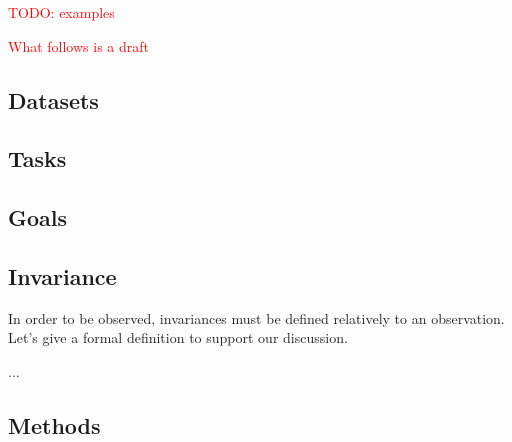 \textcolor{red}{TODO: examples}


%
%
\textcolor{red}{What follows is a draft}




\subsection{Datasets}

\subsection{Tasks} %
\label{tasks}



\subsection{Goals}

\subsection{Invariance}

In order to be observed, invariances must be defined relatively to an observation. Let's give a formal definition to support our discussion.

...

\subsection{Methods}
\label{methods}

%